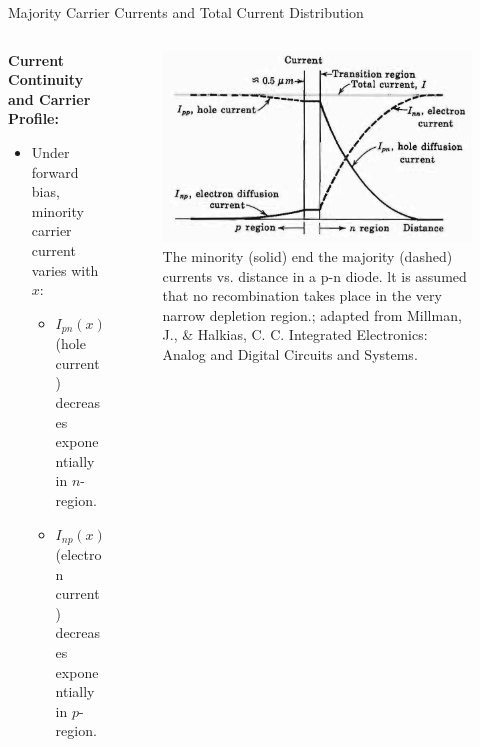 	
\begin{frame}{Majority Carrier Currents and Total Current Distribution}
	\begin{columns}
		\begin{column}{0.225\textwidth}
	\textbf{Current Continuity and Carrier Profile:}
	\begin{itemize}
		\item Under forward bias, minority carrier current varies with $x$:
		\begin{itemize}
			\item $I_{pn}(x)$ (hole current) decreases exponentially in $n$-region.
			\item $I_{np}(x)$ (electron current) decreases exponentially in $p$-region.
		\end{itemize}
	\end{itemize}
\end{column}
		\begin{column}{0.775\textwidth}
	\begin{figure}	
		\centering
		\includegraphics[scale=0.325]{fig/lec03/majority_and_minority_vs_distance.png}
		\caption{The minority (solid) end the majority (dashed) currents vs. distance
		in a p-n diode. lt is assumed that no recombination takes place in the very	narrow depletion region.; adapted from Millman, J., \& Halkias, C. C. Integrated Electronics: Analog and Digital Circuits and Systems.}
		\label{fig:minority_and_majority_current}
	\end{figure}
	\end{column}
	\end{columns}
\end{frame}


